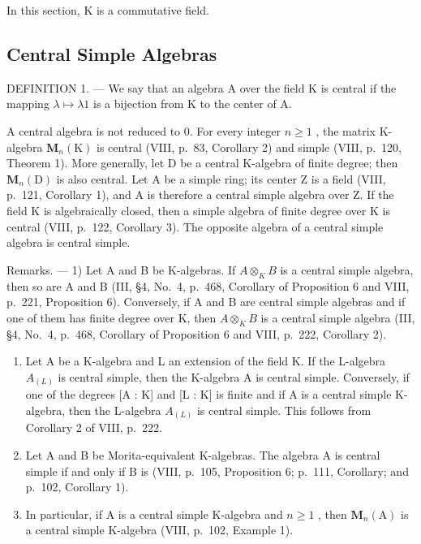 In this section, K is a commutative field.

\subsection{Central Simple Algebras}

DEFINITION 1. --- We say that an algebra A over the field K is central if the mapping \(\lambda\mapsto\lambda1\) is a bijection from K to the center of A.

A central algebra is not reduced to 0. For every integer \(n \geqslant 1\) , the matrix K-algebra \(\mathbf{M}_{n}(\mathrm{K})\) is central (VIII, p.~83, Corollary 2) and simple (VIII, p.~120, Theorem 1). More generally, let D be a central K-algebra of finite degree; then \(\mathbf{M}_{n}(\mathrm{D})\) is also central. Let A be a simple ring; its center Z is a field (VIII, p.~121, Corollary 1), and A is therefore a central simple algebra over Z. If the field K is algebraically closed, then a simple algebra of finite degree over K is central (VIII, p.~122, Corollary 3). The opposite algebra of a central simple algebra is central simple.

Remarks. --- 1) Let A and B be K-algebras. If \(A \otimes_{K} B\) is a central simple algebra, then so are A and B (III, §4, No.~4, p.~468, Corollary of Proposition 6 and VIII, p.~221, Proposition 6). Conversely, if A and B are central simple algebras and if one of them has finite degree over K, then \(A \otimes_{K} B\) is a central simple algebra (III, §4, No.~4, p.~468, Corollary of Proposition 6 and VIII, p.~222, Corollary 2).

\begin{enumerate}
\def\labelenumi{\arabic{enumi})}
\setcounter{enumi}{1}
\item
  Let A be a K-algebra and L an extension of the field K. If the L-algebra \(A_{(L)}\) is central simple, then the K-algebra A is central simple. Conversely, if one of the degrees {[}A : K{]} and {[}L : K{]} is finite and if A is a central simple K-algebra, then the L-algebra \(A_{(L)}\) is central simple. This follows from Corollary 2 of VIII, p.~222.
\item
  Let A and B be Morita-equivalent K-algebras. The algebra A is central simple if and only if B is (VIII, p.~105, Proposition 6; p.~111, Corollary; and p.~102, Corollary 1).
\item
  In particular, if A is a central simple K-algebra and \(n \geqslant 1\) , then \(\mathbf{M}_{n}(\mathrm{A})\) is a central simple K-algebra (VIII, p.~102, Example 1).
\end{enumerate}

